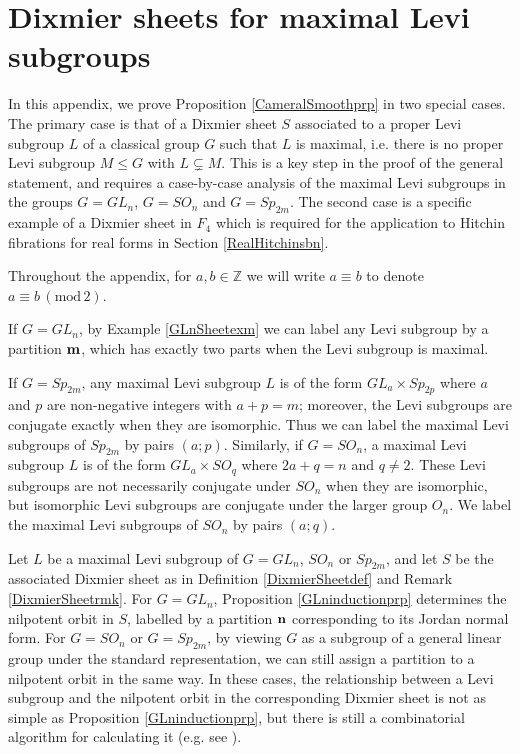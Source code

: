 \documentclass{amsart}
\theoremstyle{remark}
\numberwithin{theorem}{section}
\numberwithin{equation}{section}
\begin{document}
\appendix
\section{Dixmier sheets for maximal Levi subgroups}\label{DixmierClassicalscn}
In this appendix, we prove Proposition \ref{CameralSmoothprp} in two special cases. The primary case is that of a Dixmier sheet $S$ associated to a proper Levi subgroup $L$ of a classical group $G$ such that $L$ is maximal, i.e. there is no proper Levi subgroup $M \leq G$ with $L \subsetneq M$. This is a key step in the proof of the general statement, and requires a case-by-case analysis of the maximal Levi subgroups in the groups $G = GL_n$, $G=SO_n$ and $G=Sp_{2m}$. The second case is a specific example of a Dixmier sheet in $F_4$ which is required for the application to Hitchin fibrations for real forms in Section \ref{RealHitchinsbn}.

Throughout the appendix, for $a,b \in \mathbb{Z}$ we will write $a \equiv b$ to denote $a \equiv b \, ( \text{mod} \, 2)$.

If $G = GL_n$, by Example \ref{GLnSheetexm} we can label any Levi subgroup by a partition ${\bf m}$, which has exactly two parts when the Levi subgroup is maximal. 

If $G = Sp_{2m}$, any maximal Levi subgroup $L$ is of the form $GL_a \times Sp_{2p}$ where $a$ and $p$ are non-negative integers with $a+p =m$; moreover, the Levi subgroups are conjugate exactly when they are isomorphic. Thus we can label the maximal Levi subgroups of $Sp_{2m}$ by pairs $(a;p)$. Similarly, if $G = SO_n$, a maximal Levi subgroup $L$ is of the form $GL_a \times SO_{q}$ where $2a+q =n$ and $q \neq 2$. These Levi subgroups are not necessarily conjugate under $SO_n$ when they are isomorphic, but isomorphic Levi subgroups are conjugate under the larger group $O_n$. We label the maximal Levi subgroups of $SO_n$ by pairs $(a;q)$.

Let $L$ be a maximal Levi subgroup of $G = GL_n$, $SO_n$ or $Sp_{2m}$, and let $S$ be the associated Dixmier sheet as in Definition \ref{DixmierSheetdef} and Remark \ref{DixmierSheetrmk}. For $G=GL_n$, Proposition \ref{GLninductionprp} determines the nilpotent orbit in $S$, labelled by a partition ${\bf n}$ corresponding to its Jordan normal form. For $G=SO_n$ or $G=Sp_{2m}$, by viewing $G$ as a subgroup of a general linear group under the standard representation, we can still assign a partition to a nilpotent orbit in the same way. In these cases, the relationship between a Levi subgroup and the nilpotent orbit in the corresponding Dixmier sheet is not as simple as Proposition \ref{GLninductionprp}, but there is still a combinatorial algorithm for calculating it (e.g. see \cite[Lemma 7.3]{Hesselink}).
\end{document}
